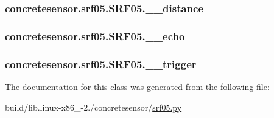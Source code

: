\subsubsection[{\+\_\+\+\_\+distance}]{\setlength{\rightskip}{0pt plus 5cm}concretesensor.\+srf05.\+S\+R\+F05.\+\_\+\+\_\+distance\hspace{0.3cm}{\ttfamily [private]}}\label{classconcretesensor_1_1srf05_1_1SRF05_a4b4ad0d8fee78ff2c03f0f39a794fbb0}
\hypertarget{classconcretesensor_1_1srf05_1_1SRF05_a65c7bd9d4f1ba4a4c7e0fd51b20eb7c2}{}
\subsubsection[{\+\_\+\+\_\+echo}]{\setlength{\rightskip}{0pt plus 5cm}concretesensor.\+srf05.\+S\+R\+F05.\+\_\+\+\_\+echo\hspace{0.3cm}{\ttfamily [private]}}\label{classconcretesensor_1_1srf05_1_1SRF05_a65c7bd9d4f1ba4a4c7e0fd51b20eb7c2}
\hypertarget{classconcretesensor_1_1srf05_1_1SRF05_a83d96daa9f2c43feb179e6b746fa1f7f}{}
\subsubsection[{\+\_\+\+\_\+trigger}]{\setlength{\rightskip}{0pt plus 5cm}concretesensor.\+srf05.\+S\+R\+F05.\+\_\+\+\_\+trigger\hspace{0.3cm}{\ttfamily [private]}}\label{classconcretesensor_1_1srf05_1_1SRF05_a83d96daa9f2c43feb179e6b746fa1f7f}


The documentation for this class was generated from the following file\+:\begin{DoxyCompactItemize}
\item 
build/lib.\+linux-\/x86\+\_-\/2./concretesensor/\hyperlink{build_2lib_8linux-x86__64-2_87_2concretesensor_2srf05_8py}{srf05.\+py}\end{DoxyCompactItemize}
